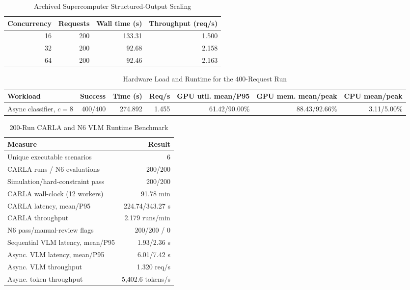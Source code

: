\begin{table}[t]
\caption{Archived Supercomputer Structured-Output Scaling}
\label{tab:hpc-scaling}
\centering
\begin{tabular}{rrrr}
\hline
Concurrency & Requests & Wall time (s) & Throughput (req/s) \\
\hline
16 & 200 & 133.31 & 1.500 \\
32 & 200 & 92.68 & 2.158 \\
64 & 200 & 92.46 & 2.163 \\
\hline
\end{tabular}
\end{table}

\begin{table}[t]
\caption{Hardware Load and Runtime for the 400-Request Run}
\label{tab:hardware-runtime}
\centering
\begin{tabular}{lrrrrrr}
\hline
Workload & Success & Time (s) & Req/s & GPU util. mean/P95 & GPU mem. mean/peak & CPU mean/peak \\
\hline
Async classifier, $c=8$ & 400/400 & 274.892 & 1.455 & 61.42/90.00\% & 88.43/92.66\% & 3.11/5.00\% \\
\hline
\end{tabular}
\end{table}

\begin{table}[t]
\caption{200-Run CARLA and N6 VLM Runtime Benchmark}
\label{tab:carla-vlm}
\centering
\begin{tabular}{lr}
\hline
Measure & Result \\
\hline
Unique executable scenarios & 6 \\
CARLA runs / N6 evaluations & 200/200 \\
Simulation/hard-constraint pass & 200/200 \\
CARLA wall-clock (12 workers) & 91.78 min \\
CARLA latency, mean/P95 & 224.74/343.27 s \\
CARLA throughput & 2.179 runs/min \\
N6 pass/manual-review flags & 200/200 / 0 \\
Sequential VLM latency, mean/P95 & 1.93/2.36 s \\
Async. VLM latency, mean/P95 & 6.01/7.42 s \\
Async. VLM throughput & 1.320 req/s \\
Async. token throughput & 5,402.6 tokens/s \\
\hline
\end{tabular}
\end{table}

